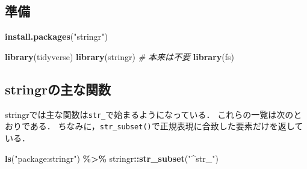 \documentclass[
]{article}
\newenvironment{Shaded}{\begin{snugshade}}{\end{snugshade}}
\newcommand{\CommentTok}[1]{\textcolor[rgb]{0.56,0.35,0.01}{\textit{#1}}}
\newcommand{\FunctionTok}[1]{\textcolor[rgb]{0.13,0.29,0.53}{\textbf{#1}}}
\newcommand{\NormalTok}[1]{#1}
\newcommand{\SpecialCharTok}[1]{\textcolor[rgb]{0.81,0.36,0.00}{\textbf{#1}}}
\newcommand{\StringTok}[1]{\textcolor[rgb]{0.31,0.60,0.02}{#1}}
\begin{document}
\hypertarget{ux6e96ux5099-2}{%
\subsection{準備}\label{ux6e96ux5099-2}}

\begin{Shaded}
\begin{Highlighting}[]
\FunctionTok{install.packages}\NormalTok{(}\StringTok{"stringr"}\NormalTok{)}
\end{Highlighting}
\end{Shaded}

\begin{Shaded}
\begin{Highlighting}[]
\FunctionTok{library}\NormalTok{(tidyverse)}
\FunctionTok{library}\NormalTok{(stringr)  }\CommentTok{\# 本来は不要}
\FunctionTok{library}\NormalTok{(fs)}
\end{Highlighting}
\end{Shaded}

\hypertarget{stringrux306eux4e3bux306aux95a2ux6570}{%
\subsection{stringrの主な関数}\label{stringrux306eux4e3bux306aux95a2ux6570}}

stringrでは主な関数は\texttt{str\_}で始まるようになっている．
これらの一覧は次のとおりである．
ちなみに，\texttt{str\_subset()}で正規表現に合致した要素だけを返している．

\begin{Shaded}
\begin{Highlighting}[]
\FunctionTok{ls}\NormalTok{(}\StringTok{"package:stringr"}\NormalTok{) }\SpecialCharTok{\%\textgreater{}\%}
\NormalTok{  stringr}\SpecialCharTok{::}\FunctionTok{str\_subset}\NormalTok{(}\StringTok{"\^{}str\_"}\NormalTok{)}
\end{Highlighting}
\end{Shaded}
\end{document}
